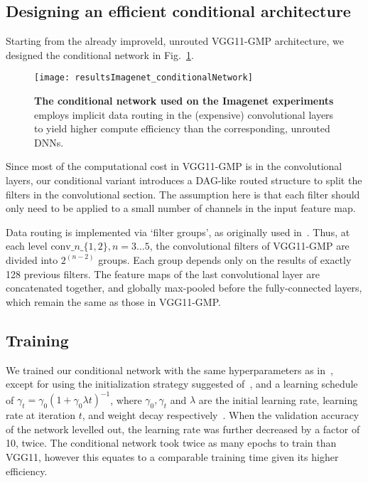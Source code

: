 \documentclass[thesis]{subfiles}
\begin{document}
\subsection{Designing an efficient conditional architecture}
Starting from the already improveld, unrouted VGG11-GMP architecture, we designed the conditional network in Fig.~\ref{fig:Imagenet_CondNet}.
\begin{figure}[t]
\centerline{
\texttt{[image: resultsImagenet\_conditionalNetwork]}
}
   \caption{{\bf The conditional network used on the Imagenet experiments} employs implicit data routing in the 
   (expensive) convolutional layers to yield higher compute efficiency than the corresponding, unrouted DNNs.}
\label{fig:Imagenet_CondNet}
\end{figure}
%
Since most of the computational cost in VGG11-GMP is in the convolutional layers, our conditional variant 
introduces a DAG-like routed structure to split the filters in the convolutional section.
The assumption here is that each filter should only need to be applied to a small number of channels in the input feature map.

Data routing is implemented via `filter groups', as originally used in~\cite{Krizhevsky2012imanet}. 
Thus, at each level $\textrm{conv}\_n\_\{1,2\}, n=3\ldots 5$, the convolutional filters of VGG11-GMP are 
divided into $2^{(n-2)}$ groups. Each group depends only on the results of exactly 128 previous filters. 
The feature maps of the last convolutional layer are concatenated together, and globally max-pooled
 before the fully-connected layers, which remain the same as those in VGG11-GMP.

\subsection{Training}
We trained our conditional network with the same hyperparameters as in~\cite{Simonyan2014verydeep}, 
except for using the initialization strategy suggested of~\cite{He2015delving}, and a learning schedule of 
$\gamma_t = \gamma_0(1+\gamma_0\lambda t)^{-1}$, where $\gamma_0,\gamma_t$ and $\lambda$ 
are the initial learning rate, learning rate at iteration $t$, and weight decay respectively~\cite{Bottou2012sgdtricks}. 
When the validation accuracy of the network levelled out, the learning rate was further decreased by a factor of 10, twice. 
The conditional network took twice as many epochs to train than VGG11, however this equates to a comparable
 training time given its higher efficiency.
\end{document}
